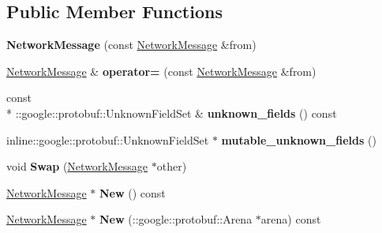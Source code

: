 \subsection*{Public Member Functions}
\begin{DoxyCompactItemize}
\item 
\hypertarget{classSimpleChat_1_1NetworkMessage_adb9c3990b39bd7fa4d21fe1fe3710230}{{\bfseries Network\-Message} (const \hyperlink{classSimpleChat_1_1NetworkMessage}{Network\-Message} \&from)}\label{classSimpleChat_1_1NetworkMessage_adb9c3990b39bd7fa4d21fe1fe3710230}

\item 
\hypertarget{classSimpleChat_1_1NetworkMessage_a2ca0a232b03313c7150c3cdf295b2fd3}{\hyperlink{classSimpleChat_1_1NetworkMessage}{Network\-Message} \& {\bfseries operator=} (const \hyperlink{classSimpleChat_1_1NetworkMessage}{Network\-Message} \&from)}\label{classSimpleChat_1_1NetworkMessage_a2ca0a232b03313c7150c3cdf295b2fd3}

\item 
\hypertarget{classSimpleChat_1_1NetworkMessage_aff73981217a39c278a2f2eb74a938d77}{const \\*
\-::google\-::protobuf\-::\-Unknown\-Field\-Set \& {\bfseries unknown\-\_\-fields} () const }\label{classSimpleChat_1_1NetworkMessage_aff73981217a39c278a2f2eb74a938d77}

\item 
\hypertarget{classSimpleChat_1_1NetworkMessage_a7d2913fbffd9f3bbf4c4c6f8c0688996}{inline\-::google\-::protobuf\-::\-Unknown\-Field\-Set $\ast$ {\bfseries mutable\-\_\-unknown\-\_\-fields} ()}\label{classSimpleChat_1_1NetworkMessage_a7d2913fbffd9f3bbf4c4c6f8c0688996}

\item 
\hypertarget{classSimpleChat_1_1NetworkMessage_a2ee30e7f81715ebabb0da01058268964}{void {\bfseries Swap} (\hyperlink{classSimpleChat_1_1NetworkMessage}{Network\-Message} $\ast$other)}\label{classSimpleChat_1_1NetworkMessage_a2ee30e7f81715ebabb0da01058268964}

\item 
\hypertarget{classSimpleChat_1_1NetworkMessage_ad8480eec6be5086ffd63ccbfb0f2ae27}{\hyperlink{classSimpleChat_1_1NetworkMessage}{Network\-Message} $\ast$ {\bfseries New} () const }\label{classSimpleChat_1_1NetworkMessage_ad8480eec6be5086ffd63ccbfb0f2ae27}

\item 
\hypertarget{classSimpleChat_1_1NetworkMessage_a0a05f8f5dd8138da2f3de39de8043ff2}{\hyperlink{classSimpleChat_1_1NetworkMessage}{Network\-Message} $\ast$ {\bfseries New} (\-::google\-::protobuf\-::\-Arena $\ast$arena) const }\label{classSimpleChat_1_1NetworkMessage_a0a05f8f5dd8138da2f3de39de8043ff2}


\end{DoxyCompactItemize}
